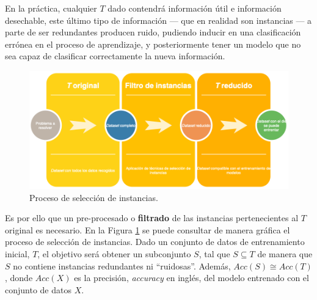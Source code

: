 En la práctica, cualquier $T$ dado contendrá información útil e información desechable, este último tipo de información --- que en realidad son instancias --- a parte de ser redundantes producen ruido, pudiendo inducir en una clasificación errónea en el proceso de aprendizaje, y posteriormente tener un modelo que no sea capaz de clasificar correctamente la nueva información.

\begin{figure}
\centering
\includegraphics[width=\linewidth]{../img/memoria/Instance-Selection-Overview}
\caption{Proceso de selección de instancias.}
\label{fig:instance-election-overview}
\end{figure}

Es por ello que un pre-procesado o \textbf{filtrado} de las instancias pertenecientes al $T$ original es necesario. En la Figura \ref{fig:instance-election-overview} se puede consultar de manera gráfica el proceso de selección de instancias. Dado un conjunto de datos de entrenamiento inicial, $T$, el objetivo será obtener un subconjunto $S$, tal que $S \subseteq T$ de manera que $S$ no contiene instancias redundantes ni ``ruidosas''. Además, $Acc(S) \cong Acc(T)$, donde $Acc(X)$ es la precisión, \textit{accuracy} en inglés, del modelo entrenado con el conjunto de datos $X$.

